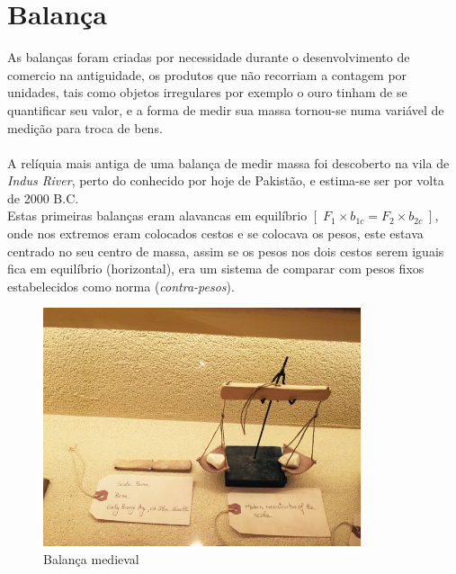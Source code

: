 \chapter{Balança}
As balanças foram criadas por necessidade durante o desenvolvimento de comercio na antiguidade, os produtos que não recorriam a contagem por unidades, tais como objetos irregulares por exemplo o ouro tinham de se quantificar seu valor, e a forma de medir sua massa tornou-se numa variável de medição para troca de bens.\\
\\
A relíquia mais antiga de uma balança de medir massa foi descoberto na vila de \textit{Indus River}, perto do conhecido por hoje de Pakistão, e estima-se ser por volta de 2000 B.C.\\
Estas primeiras balanças eram alavancas em equilíbrio $[ \; F_{1} \times b_{1c} = F_{2} \times b_{2c} \; ]$, onde nos extremos eram colocados cestos e se colocava os pesos, este estava centrado no seu centro de massa, assim se os pesos nos dois cestos serem iguais fica em equilíbrio (horizontal), era um sistema de comparar com pesos fixos estabelecidos como norma (\textit{contra-pesos}).
\\
\begin{minipage}[!b]{0.45\linewidth}
	\begin{figure}[H]
		\centering
		\includegraphics[height=7cm]{./image/PESTA/general/balanca_1.jpg}
		\caption{Balança medieval}
		\label{balanca_1}
	\end{figure}
\end{minipage}
\hspace{2.2cm}
